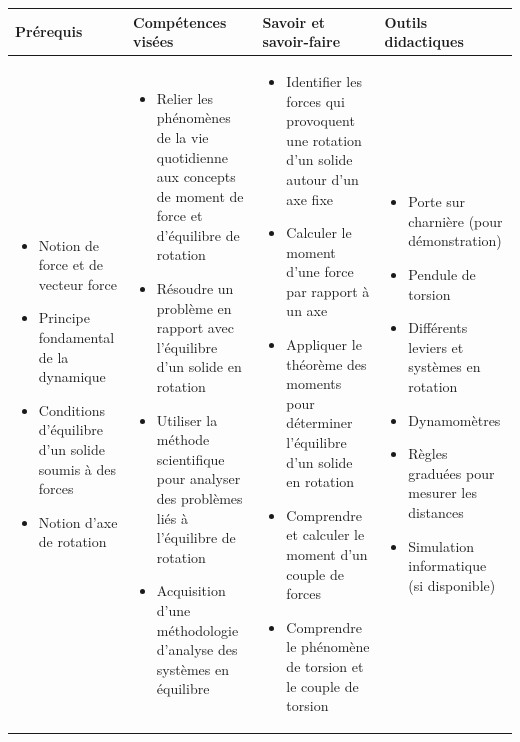 \documentclass[12pt]{article}
\begin{document}
\begin{tabular}{|p{4.5cm}|p{4.5cm}|p{4.5cm}|p{3cm}|}
\hline
\rowcolor{lightblue}
  \textbf{Prérequis} & \textbf{Compétences visées}& \textbf{Savoir et savoir-faire} & \textbf{Outils didactiques} \\
\hline
\hline
\begin{itemize}[leftmargin=*]
\item Notion de force et de vecteur force
\item Principe fondamental de la dynamique
\item Conditions d'équilibre d'un solide soumis à des forces
\item Notion d'axe de rotation
\end{itemize}
&
\begin{itemize}[leftmargin=*]
\item Relier les phénomènes de la vie quotidienne aux concepts de moment de force et d'équilibre de rotation
\item Résoudre un problème en rapport avec l'équilibre d'un solide en rotation
\item Utiliser la méthode scientifique pour analyser des problèmes liés à l'équilibre de rotation
\item Acquisition d'une méthodologie d'analyse des systèmes en équilibre
\end{itemize} 
&
\begin{itemize}[leftmargin=*]
\item Identifier les forces qui provoquent une rotation d'un solide autour d'un axe fixe
\item Calculer le moment d'une force par rapport à un axe
\item Appliquer le théorème des moments pour déterminer l'équilibre d'un solide en rotation
\item Comprendre et calculer le moment d'un couple de forces
\item Comprendre le phénomène de torsion et le couple de torsion
\end{itemize}
&
\begin{itemize}[leftmargin=*]
\item Porte sur charnière (pour démonstration)
\item Pendule de torsion
\item Différents leviers et systèmes en rotation
\item Dynamomètres
\item Règles graduées pour mesurer les distances
\item Simulation informatique (si disponible)
\end{itemize}

  \\
\hline
\end{tabular}
\end{document}
